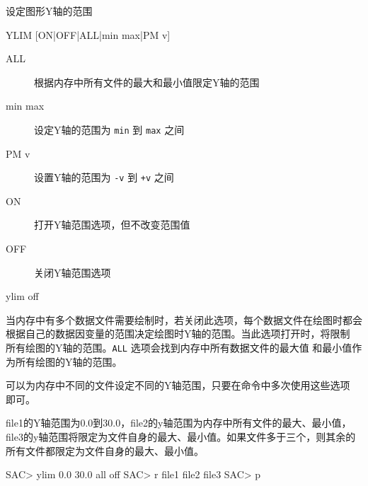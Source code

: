 \label{cmd:ylim}

设定图形Y轴的范围

\begin{SACSTX}
YLIM [ON|OFF|ALL|min max|PM v]
\end{SACSTX}

\begin{description}
\item [ALL] 根据内存中所有文件的最大和最小值限定Y轴的范围
\item [min max] 设定Y轴的范围为 \texttt{min} 到 \texttt{max} 之间
\item [PM v] 设置Y轴的范围为 \texttt{-v} 到 \texttt{+v} 之间
\item [ON] 打开Y轴范围选项，但不改变范围值
\item [OFF] 关闭Y轴范围选项
\end{description}

\begin{SACDFT}
ylim off
\end{SACDFT}

当内存中有多个数据文件需要绘制时，若关闭此选项，每个数据文件在绘图时都会
根据自己的数据因变量的范围决定绘图时Y轴的范围。当此选项打开时，将限制
所有绘图的Y轴的范围。\texttt{ALL} 选项会找到内存中所有数据文件的最大值
和最小值作为所有绘图的Y轴的范围。

可以为内存中不同的文件设定不同的Y轴范围，只要在命令中多次使用这些选项
即可。

file1的Y轴范围为0.0到30.0，file2的y轴范围为内存中所有文件的最大、最小值，
file3的y轴范围将限定为文件自身的最大、最小值。如果文件多于三个，则其余的
所有文件都限定为文件自身的最大、最小值。
\begin{SACCode}
SAC> ylim 0.0 30.0 all off
SAC> r file1 file2 file3
SAC> p
\end{SACCode}
